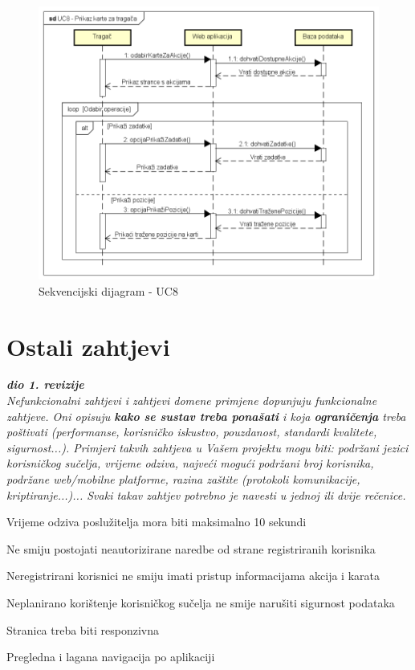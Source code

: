 				\begin{figure}[H]
					\includegraphics[scale=0.7]{slike/UC8_sekv.PNG} %
					\centering
					\caption{Sekvencijski dijagram - UC8}
					\label{fig:promjene}
				\end{figure}
	
		\section{Ostali zahtjevi}
		
			\textbf{\textit{dio 1. revizije}}\\
		 
			 \textit{Nefunkcionalni zahtjevi i zahtjevi domene primjene dopunjuju funkcionalne zahtjeve. Oni opisuju \textbf{kako se sustav treba ponašati} i koja \textbf{ograničenja} treba poštivati (performanse, korisničko iskustvo, pouzdanost, standardi kvalitete, sigurnost...). Primjeri takvih zahtjeva u Vašem projektu mogu biti: podržani jezici korisničkog sučelja, vrijeme odziva, najveći mogući podržani broj korisnika, podržane web/mobilne platforme, razina zaštite (protokoli komunikacije, kriptiranje...)... Svaki takav zahtjev potrebno je navesti u jednoj ili dvije rečenice.}
			 
			 \begin{packed_item}
			 	\item Vrijeme odziva poslužitelja mora biti maksimalno 10 sekundi
			 	\item Ne smiju postojati neautorizirane naredbe od strane registriranih korisnika
			 	\item Neregistrirani korisnici ne smiju imati pristup informacijama akcija i karata
			 	\item Neplanirano korištenje korisničkog sučelja ne smije narušiti sigurnost podataka
			 	\item Stranica treba biti responzivna
			 	\item Pregledna i lagana navigacija po aplikaciji
			 \end{packed_item}
			 
			 
			 
	